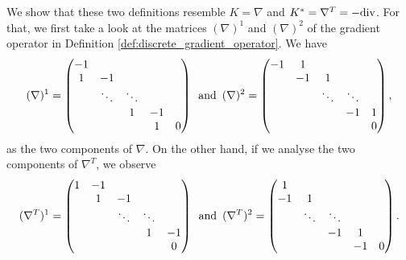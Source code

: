 \documentclass[abstracton]{scrreprt}
\begin{document}
        We show that these two definitions resemble $K = \nabla$ and $K^{\ast} = \nabla^{T} = -\textnormal{div}$. For that, we first take a look at the matrices $(\nabla)^{1}$ and $(\nabla)^{2}$ of the gradient operator in Definition \ref{def:discrete_gradient_operator}. We have
            $$
                (\nabla)^{1} = 
                \begin{pmatrix}
                    -1 & & & & \\
                    1 & -1 & & & \\
                      & \ddots & \ddots & & \\
                      & & 1 & -1 & \\
                      & & & 1 & 0
                \end{pmatrix} \,\,\, \textnormal{and} \,\,\,
                (\nabla)^{2} =
                \begin{pmatrix}
                    -1 & 1 & & & \\
                      & -1 & 1 & & \\
                      & & \ddots & \ddots & \\
                      & & & -1 & 1 \\
                      & & & & 0
                \end{pmatrix},
            $$
        as the two components of $\nabla$. On the other hand, if we analyse the two components of $\nabla^{T}$, we observe
            $$
                (\nabla^{T})^{1} = 
                \begin{pmatrix}
                    1 & -1 & & & \\
                      & 1 & -1 & & \\
                      & & \ddots & \ddots & \\
                      & & & 1 & -1 \\
                      & & & & 0
                \end{pmatrix} \,\,\, \textnormal{and} \,\,\,
                (\nabla^{T})^{2} =
                \begin{pmatrix}
                    1 & & & & \\
                    -1 & 1 & & & \\
                      & \ddots & \ddots & & \\
                      & & -1 & 1 & \\
                      & & & -1 & 0
                \end{pmatrix}.
            $$
\end{document}
